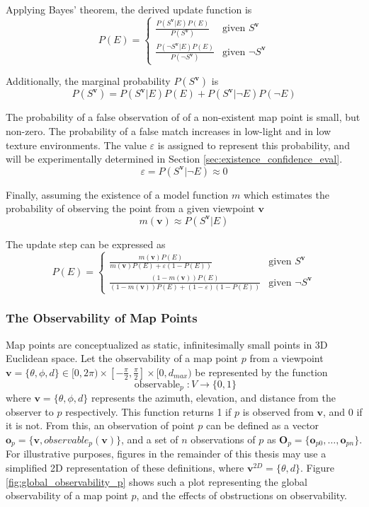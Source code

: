 Applying Bayes' theorem, the derived update function is
\[
    P(E) = \begin{cases}
        \frac{P(S^{\boldsymbol{v}}|E)P(E)}{P(S^{\boldsymbol{v}})}           & \text{given }S^{\boldsymbol{v}}      \\
        \frac{P(\neg S^{\boldsymbol{v}}|E)P(E)}{P(\neg S^{\boldsymbol{v}})} & \text{given }\neg S^{\boldsymbol{v}}
    \end{cases}
\]

Additionally, the marginal probability $P(S^{\boldsymbol{v}})$ is
$$
    P(S^{\boldsymbol{v}}) = P(S^{\boldsymbol{v}}|E)P(E) + P(S^{\boldsymbol{v}}|\neg E)P(\neg E)
$$

The probability of a false observation of of a non-existent map point is small, but non-zero. The probability of a false match increases in low-light and in low texture environments. The value $\varepsilon$ is assigned to represent this probability, and will be experimentally determined in Section \ref{sec:existence_confidence_eval}.
$$
    \varepsilon = P(S^{\boldsymbol{v}}|\neg E) \approx 0
$$

Finally, assuming the existence of a model function $m$ which estimates the probability of observing the point from a given viewpoint $\boldsymbol{v}$
$$
    m(\boldsymbol{v}) \approx P(S^{\boldsymbol{v}}|E)
$$

The update step can be expressed as
\[
    P(E) = \begin{cases}
        \frac{m(\boldsymbol{v})P(E)}{m(\boldsymbol{v})P(E) + \varepsilon(1-P(E))}             & \text{given }S^{\boldsymbol{v}}      \\
        \frac{(1-m(\boldsymbol{v}))P(E)}{(1-m(\boldsymbol{v}))P(E) + (1-\varepsilon)(1-P(E))} & \text{given }\neg S^{\boldsymbol{v}}
    \end{cases}
\]

\subsubsection{The Observability of Map Points}

Map points are conceptualized as static, infinitesimally small points in 3D Euclidean space. Let the observability of a map point $p$ from a viewpoint $\boldsymbol{v} = \{\theta,\phi,d\}\in[0,2\pi)\times\left[-\frac{\pi}{2},\frac{\pi}{2}\right]\times[0,d_{max})$ be represented by the function
$$
    \operatorname{observable}_p : V \to \{0, 1\}
$$
where $\boldsymbol{v} = \{\theta,\phi,d\}$ represents the azimuth, elevation, and distance from the observer to $p$ respectively. This function returns 1 if $p$ is observed from $\boldsymbol{v}$, and 0 if it is not. From this, an observation of point $p$ can be defined as a vector $\boldsymbol{o}_p=\{\boldsymbol{v},observable_p(\boldsymbol{v})\}$, and a set of $n$ observations of $p$ as $\boldsymbol{O}_p=\{\boldsymbol{o}_{p0},\dots,\boldsymbol{o}_{pn}\}$. For illustrative purposes, figures in the remainder of this thesis may use a simplified 2D representation of these definitions, where $\boldsymbol{v}^{2D}=\{\theta,d\}$. Figure \ref{fig:global_observability_p} shows such a plot representing the global observability of a map point $p$, and the effects of obstructions on observability.

